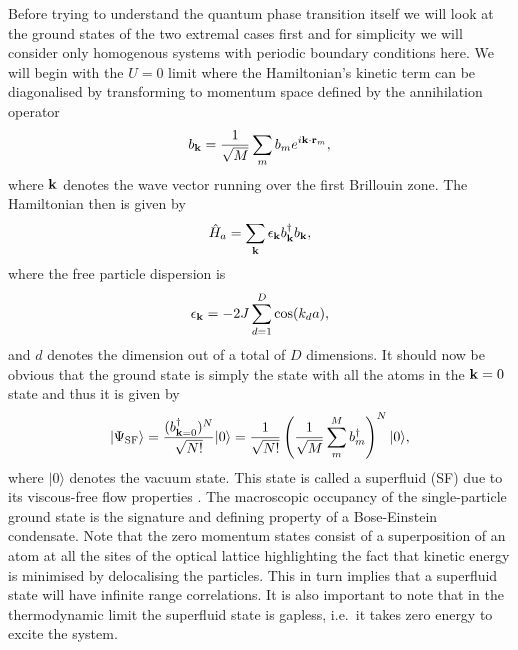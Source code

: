 Before trying to understand the quantum phase transition itself we
will look at the ground states of the two extremal cases first and for
simplicity we will consider only homogenous systems with periodic
boundary conditions here. We will begin with the $U = 0$ limit where
the Hamiltonian's kinetic term can be diagonalised by transforming to
momentum space defined by the annihilation operator
\begin{equation}
  b_{\mathbf{k}} = \frac{1} {\sqrt{M}} \sum_m b_m e^{i \mathbf{k} \cdot \mathbf{r}_m},
\end{equation}
where $\mathbf{k}$ denotes the wave vector running over the first Brillouin
zone. The Hamiltonian then is given by
\begin{equation}
  \hat{H}_a = \sum_{\mathbf{k}} \epsilon_{\mathbf{k}} b^\dagger_{\mathbf{k}} b_{\mathbf{k}},
\end{equation}
where the free particle dispersion is
\begin{equation}
  \epsilon_{\mathbf{k}} = -2 J \sum_{d = 1}^D \cos(k_d a),
\end{equation}
and $d$ denotes the dimension out of a total of $D$ dimensions. It
should now be obvious that the ground state is simply the state with
all the atoms in the $\mathbf{k} = 0$ state and thus it is given by
\begin{equation}
  \label{eq:GSSF}
  | \Psi_\mathrm{SF} \rangle = \frac{ ( b^\dagger_{\mathbf{k} = 0} )^N } {\sqrt{N!}} | 0
  \rangle = \frac{1} {\sqrt{N!}} \left( \frac{1} {\sqrt{M}} \sum_m^M
    b^\dagger_m \right)^N | 0 \rangle,
\end{equation}
where $| 0 \rangle$ denotes the vacuum state. This state is called a
superfluid (SF) due to its viscous-free flow properties
\cite{leggett1999}. The macroscopic occupancy of the single-particle
ground state is the signature and defining property of a
Bose-Einstein condensate. Note that the zero momentum states consist of a
superposition of an atom at all the sites of the optical lattice
highlighting the fact that kinetic energy is minimised by delocalising
the particles. This in turn implies that a superfluid state will have
infinite range correlations. It is also important to note that in the
thermodynamic limit the superfluid state is gapless, i.e.~it takes
zero energy to excite the system.

